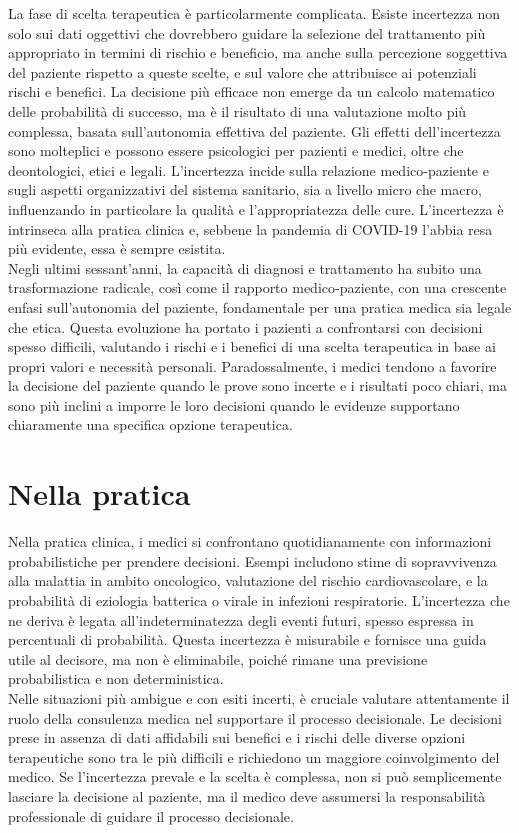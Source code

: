 La fase di scelta terapeutica è particolarmente complicata. Esiste incertezza non solo sui dati oggettivi che dovrebbero guidare la selezione del trattamento più appropriato in termini di rischio e beneficio, ma anche sulla percezione soggettiva del paziente rispetto a queste scelte, e sul valore che attribuisce ai potenziali rischi e benefici. La decisione più efficace non emerge da un calcolo matematico delle probabilità di successo, ma è il risultato di una valutazione molto più complessa, basata sull'autonomia effettiva del paziente. 
Gli effetti dell'incertezza sono molteplici e possono essere psicologici per pazienti e medici, oltre che deontologici, etici e legali. L'incertezza incide sulla relazione medico-paziente e sugli aspetti organizzativi del sistema sanitario, sia a livello micro che macro, influenzando in particolare la qualità e l'appropriatezza delle cure.
L'incertezza è intrinseca alla pratica clinica e, sebbene la pandemia di COVID-19 l'abbia resa più evidente, essa è sempre esistita.\\

Negli ultimi sessant'anni, la capacità di diagnosi e trattamento ha subito una trasformazione radicale, così come il rapporto medico-paziente, con una crescente enfasi sull'autonomia del paziente, fondamentale per una pratica medica sia legale che etica. Questa evoluzione ha portato i pazienti a confrontarsi con decisioni spesso difficili, valutando i rischi e i benefici di una scelta terapeutica in base ai propri valori e necessità personali. Paradossalmente, i medici tendono a favorire la decisione del paziente quando le prove sono incerte e i risultati poco chiari, ma sono più inclini a imporre le loro decisioni quando le evidenze supportano chiaramente una specifica opzione terapeutica.



\section{Nella pratica}
Nella pratica clinica, i medici si confrontano quotidianamente con informazioni probabilistiche per prendere decisioni. Esempi includono stime di sopravvivenza alla malattia in ambito oncologico, valutazione del rischio cardiovascolare, e la probabilità di eziologia batterica o virale in infezioni respiratorie. L'incertezza che ne deriva è legata all'indeterminatezza degli eventi futuri, spesso espressa in percentuali di probabilità. Questa incertezza è misurabile e fornisce una guida utile al decisore, ma non è eliminabile, poiché rimane una previsione probabilistica e non deterministica.\\
Nelle situazioni più ambigue e con esiti incerti, è cruciale valutare attentamente il ruolo della consulenza medica nel supportare il processo decisionale. Le decisioni prese in assenza di dati affidabili sui benefici e i rischi delle diverse opzioni terapeutiche sono tra le più difficili e richiedono un maggiore coinvolgimento del medico. Se l'incertezza prevale e la scelta è complessa, non si può semplicemente lasciare la decisione al paziente, ma il medico deve assumersi la responsabilità professionale di guidare il processo decisionale.\\

